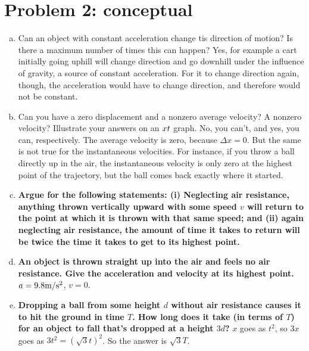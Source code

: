 \documentclass[10pt,letter]{article}
\begin{document}
\section*{Problem 2: conceptual}
\begin{enumerate}[(a)]
\item {\rm Can an object with constant acceleration change tis direction of motion? Is there a maximum number of times this can happen?}
Yes, for example a cart initially going uphill will change direction and go downhill under the influence of gravity, a source of constant acceleration. For it to change direction again, though, the acceleration would have to change direction, and therefore would not be constant.
\item {\rm Can you have a zero displacement and a nonzero average velocity? A nonzero velocity? Illustrate your answers on an $x\-t$ graph.}
No, you can't, and yes, you can, respectively. The average velocity is zero, because $\Delta x = 0$. But the same is not true for the instantaneous velocities. For instance, if you throw a ball directly up in the air, the instantaneous velocity is only zero at the highest point of the trajectory, but the ball comes back exactly where it started.
\item {\bf Argue for the following statements: (i) Neglecting air resistance, anything thrown vertically upward with some speed $v$ will return to the point at which it is thrown with that same speed; and (ii) again neglecting air resistance, the amount of time it takes to return will be twice the time it takes to get to its highest point.}
\item {\bf An object is thrown straight up into the air and feels no air resistance. Give the acceleration and velocity at its highest point.}
$a = 9.8 {\rm m}/{\rm s}^2$, $v = 0$.
\item {\bf Dropping a ball from some height $d$ without air resistance causes it to hit the ground in time $T$. How long does it take (in terms of $T$) for an object to fall that's dropped at a height $3d$?}
$x$ goes as $t^2$, so $3x$ goes as $3t^2 = (\sqrt{3}t)^2$. So the answer is $\sqrt{3}T$.
\end{enumerate}
\end{document}

